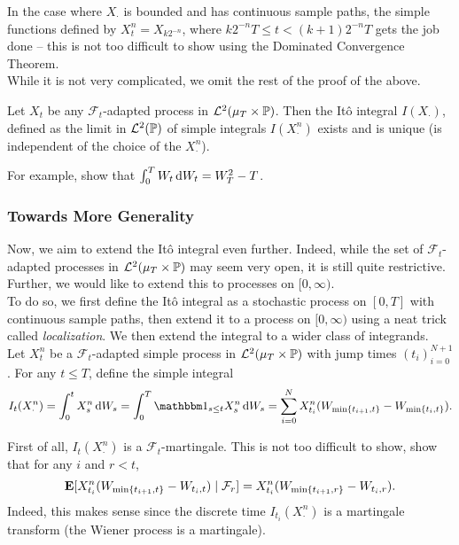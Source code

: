 In the case where $X_\cdot$ is bounded and has continuous sample paths, the simple functions defined by $X_t^n = X_{k2^{-n}}$, where $k2^{-n}T \leq t < (k+1)2^{-n}T$ gets the job done -- this is not too difficult to show using the Dominated Convergence Theorem.\\
While it is not very complicated, we omit the rest of the proof of the above.

\begin{definition}
	Let $X_t$ be any $\mathcal{F}_t$-adapted process in $\mathcal{L}^2(\mu_T\times\mathbb{P})$. Then the It\^{o} integral $I(X_\cdot)$, defined as the limit in $\mathcal{L}^2(\mathbb{P})$ of simple integrals $I(X_\cdot^n)$ exists and is unique (is independent of the choice of the $X_\cdot^n$).
\end{definition}

For example, show that $\int_0^T W_t\operatorname{d}\!{W}_t = W_T^2 - T$.

\subsubsection{Towards More Generality}

Now, we aim to extend the It\^{o} integral even further. Indeed, while the set of $\mathcal{F}_t$-adapted processes in $\mathcal{L}^2(\mu_T\times\mathbb{P})$ may seem very open, it is still quite restrictive. Further, we would like to extend this to processes on $[0,\infty)$.\\
To do so, we first define the It\^{o} integral as a stochastic process on $[0,T]$ with continuous sample paths, then extend it to a process on $[0,\infty)$ using a neat trick called \textit{localization}. We then extend the integral to a wider class of integrands.\\

Let $X^n_t$ be a $\mathcal{F}_t$-adapted simple process in $\mathcal{L}^2(\mu_T\times\mathbb{P})$ with jump times $(t_i)_{i=0}^{N+1}$. For any $t\leq T$, define the simple integral
\[ I_t(X^n_\cdot) = \int_0^t X_s^n \d{W}_s = \int_0^T \indic_{s\leq t} X_s^n \d{W}_s = \sum_{i=0}^N X_{t_i}^n (W_{\min\{t_{i+1}, t\}} - W_{\min\{t_i,t\}}). \]

First of all, $I_t(X^n_\cdot)$ is a $\mathcal{F}_t$-martingale. This is not too difficult to show, show that for any $i$ and $r<t$,
\[ \textbf{E}[X_{t_i}^n(W_{\min\{t_{i+1},t\}} - W_{t_{i},t}) \mid \mathcal{F}_r] = X_{t_i}^n (W_{\min\{t_{i+1},r\}} - W_{t_{i},r}). \]
Indeed, this makes sense since the discrete time $I_{t_i}(X^n_\cdot)$ is a martingale transform (the Wiener process is a martingale).


